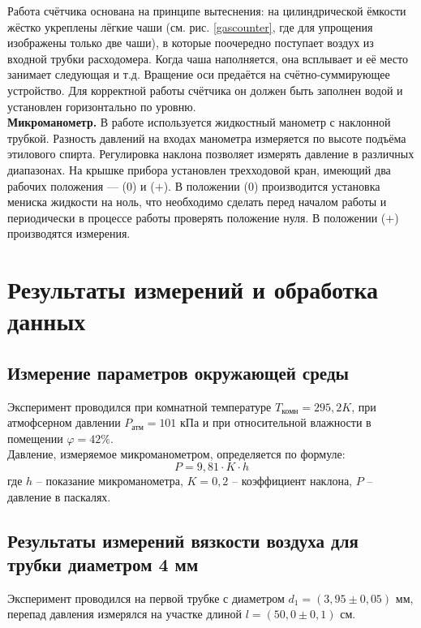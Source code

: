 \documentclass[a4paper, 12pt]{article}
\begin{document}
    \noindent Работа счётчика основана на принципе вытеснения: на цилиндрической ёмкости жёстко укреплены лёгкие чаши (см. рис. \ref{gascounter}, где для упрощения изображены только две чаши), в которые поочередно поступает воздух из входной трубки расходомера. Когда чаша наполняется, она всплывает и её место занимает следующая и т.д. Вращение оси предаётся на счётно-суммирующее устройство. Для корректной работы счётчика он должен быть заполнен водой и установлен горизонтально по уровню. \\

    \noindent \textbf{Микроманометр.} В работе используется жидкостный манометр с наклонной трубкой. Разность давлений на входах манометра измеряется по высоте подъёма этилового спирта. Регулировка наклона позволяет измерять давление в различных диапазонах. На крышке прибора установлен трехходовой кран, имеющий два рабочих положения — ($0$) и ($+$). В положении ($0$) производится установка мениска жидкости на ноль, что необходимо сделать перед началом работы и периодически в процессе работы проверять положение нуля. В положении ($+$) производятся измерения.

    \section*{Результаты измерений и обработка данных}

    \subsection*{Измерение параметров окружающей среды}

    \noindent Эксперимент проводился при комнатной температуре $T_\text{комн} = 295,2 K$, при атмофсерном давлении $P_\text{атм} = 101$ кПа и при относительной влажности в помещении $\varphi = 42 \%$. \\

    \noindent Давление, измеряемое микроманометром, определяется по формуле: \[ P = 9,81 \cdot K \cdot h \] где $h$ -- показание микроманометра, $K = 0,2$ -- коэффициент наклона, $P$ -- давление в паскалях.

    \subsection*{Результаты измерений вязкости воздуха для трубки диаметром 4 мм}

    \noindent Эксперимент проводился на первой трубке с диаметром $d_1 = \left( 3,95 \pm 0,05 \right)$ мм, перепад давления измерялся на участке длиной $l = \left(50,0 \pm 0,1 \right)$ см. 
\end{document}
